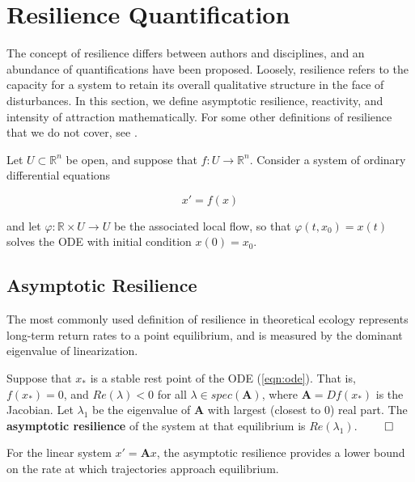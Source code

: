 \section{Resilience Quantification}
\label{sec:resilience}

The concept of resilience differs between authors and disciplines, and an abundance of quantifications have been proposed. Loosely, resilience refers to the capacity for a system to retain its overall qualitative structure in the face of disturbances. 
%
In this section, we define asymptotic resilience, reactivity, and intensity of attraction mathematically. 
%
For some other definitions of resilience that we do not cover, see \cite{meyerMathematicalReviewResilience2016}.



Let $U \subset \mathbb{R}^n$ be open, and suppose that $f : U \to \mathbb{R}^n$. Consider a system of ordinary differential equations 

\begin{equation}
	\label{eqn:ode}
	x' = f(x)
\end{equation}

and let $\varphi: \mathbb{R} \times U \to U$ be the associated local flow, so that $\varphi(t,x_0) = x(t)$ solves the ODE with initial condition $x(0) = x_0$.

\subsection{Asymptotic Resilience}

 The most commonly used definition of resilience in theoretical ecology represents long-term return rates to a point equilibrium, and is measured by the dominant eigenvalue of linearization. 
 
 \begin{definition}
 	  Suppose that $x_\ast$ is a stable rest point of the ODE (\ref{eqn:ode}). That is, $f(x_\ast) = 0$, and $Re(\lambda) < 0$ for all $\lambda \in spec(\textbf{A})$, where $\textbf{A} = Df(x_\ast)$ is the Jacobian. Let $\lambda_1$ be the eigenvalue of $\textbf{A}$ with largest (closest to 0) real part. 
 	  The \textbf{asymptotic resilience} of the system at that equilibrium is $Re(\lambda_1)$. \( \qed \)
 \end{definition}

For the linear system $x'= \textbf{A}x$, the asymptotic resilience provides a lower bound on the rate at which trajectories approach equilibrium. 

